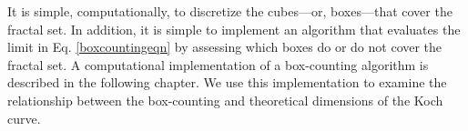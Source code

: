 It is simple, computationally, to discretize the cubes---or, boxes---that cover the fractal set. In addition, it is simple to implement an algorithm that evaluates the limit in Eq. \ref{boxcountingeqn} by assessing which boxes do or do not cover the fractal set. A computational implementation of a box-counting algorithm is described in the following chapter. We use this implementation to examine the relationship between the box-counting and theoretical dimensions of the Koch curve.






























